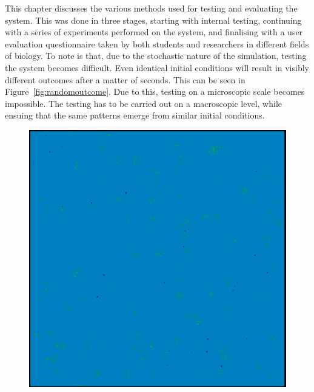 This chapter discusses the various methods used for testing and evaluating the system. This was done in three stages, starting with internal testing, continuing with a series of experiments performed on the system, and finalising with a user evaluation questionnaire taken by both students and researchers in different fields of biology. To note is that, due to the stochastic nature of the simulation, testing the system becomes difficult. Even identical initial conditions will result in visibly different outcomes after a matter of seconds. This can be seen in Figure~\ref{fig:randomoutcome}. Due to this, testing on a microscopic scale becomes impossible. The testing has to be carried out on a macroscopic level, while ensuing that the same patterns emerge from similar initial conditions.

\begin{figure}[!th]
	\centering
	\begin{minipage}[b]{0.49\textwidth}
		\includegraphics[scale=0.37]{images/test1}
	\end{minipage}
	\hfill
	\begin{minipage}[b]{0.5\textwidth}

\end{minipage}
\end{figure}
